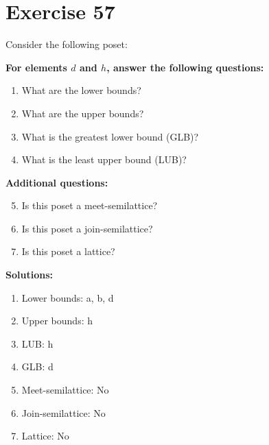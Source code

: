 \documentclass{article}
\begin{document}
\section*{Exercise 57}
Consider the following poset:
\begin{center}
\end{center}

    \textbf{For elements $d$ and $h$, answer the following questions:}
\begin{enumerate}
    \item What are the lower bounds?
    \item What are the upper bounds?
    \item What is the greatest lower bound (GLB)?
    \item What is the least upper bound (LUB)?
\end{enumerate}
    \hspace*{3ex} \textbf{Additional questions:}
\begin{enumerate}
    \setcounter{enumi}{4}
    \item Is this poset a meet-semilattice?
    \item Is this poset a join-semilattice?
    \item Is this poset a lattice?
\end{enumerate}

\textbf{Solutions:}
\begin{enumerate}
    \item Lower bounds: {a, b, d}
    \item Upper bounds: {h}
    \item LUB: h
    \item GLB: d
    \item Meet-semilattice: No
    \item Join-semilattice: No
    \item Lattice: No
\end{enumerate}
\newpage
\end{document}
